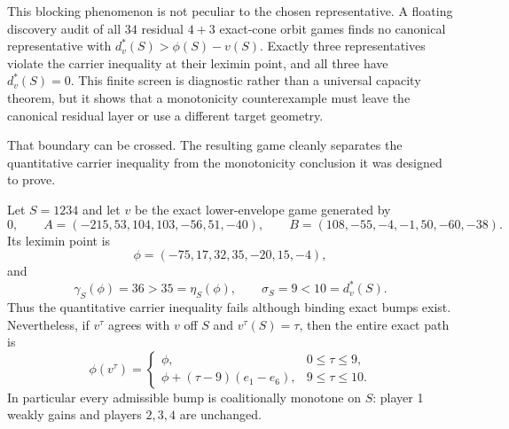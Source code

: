 This blocking phenomenon is not peculiar to the chosen representative.  A
floating discovery audit of all $34$ residual $4+3$ exact-cone orbit games
finds no canonical representative with $d_v^*(S)>\phi(S)-v(S)$.  Exactly
three representatives violate the carrier inequality at their leximin point,
and all three have $d_v^*(S)=0$.  This finite screen is diagnostic rather than
a universal capacity theorem, but it shows that a monotonicity counterexample
must leave the canonical residual layer or use a different target geometry.

That boundary can be crossed.  The resulting game cleanly separates the
quantitative carrier inequality from the monotonicity conclusion it was
designed to prove.

\begin{proposition}
\label{prop:lx-n7-bumpable-carrier-monotone}
Let $S=1234$ and let $v$ be the exact lower-envelope game generated by
\[
 0,\qquad
 A=(-215,53,104,103,-56,51,-40),\qquad
 B=(108,-55,-4,-1,50,-60,-38).
\]
Its leximin point is
\[
 \phi=(-75,17,32,35,-20,15,-4),
\]
and
\[
 \gamma_S(\phi)=36>35=\eta_S(\phi),\qquad
 \sigma_S=9<10=d_v^*(S).                         \tag{BM}
 \label{eq:lx-n7-bumpable-margins}
\]
Thus the quantitative carrier inequality fails although binding exact bumps
exist.  Nevertheless, if $v^\tau$ agrees with $v$ off $S$ and
$v^\tau(S)=\tau$, then the entire exact path is
\[
 \phi(v^\tau)=
 \begin{cases}
  \phi,&0\leq\tau\leq9,\\
  \phi+(\tau-9)(e_1-e_6),&9\leq\tau\leq10.
 \end{cases}                                      \tag{MP}
 \label{eq:lx-n7-bumpable-monotone-path}
\]
In particular every admissible bump is coalitionally monotone on $S$: player
1 weakly gains and players $2,3,4$ are unchanged.
\end{proposition}

